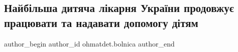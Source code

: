  
 
 
 
 
 
\subsection{Найбільша дитяча лікарня України продовжує працювати та надавати допомогу дітям}
\label{sec:24_11_2022.fb.ohmatdet.bolnica.1.pracja}
 
\ifcmt
 author_begin
   author_id ohmatdet.bolnica
 author_end
\fi
